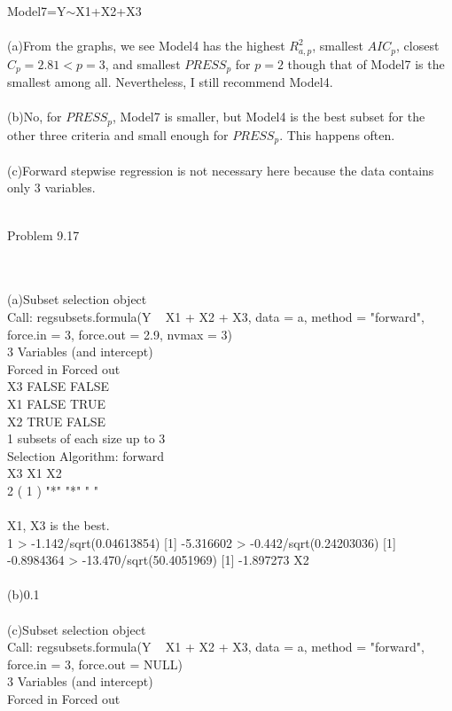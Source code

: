\documentclass{article}
\begin{document}
   Model7=Y$\sim$X1+X2+X3\\\\
   (a)From the graphs, we see Model4 has the highest $R^2_{a,p}$, smallest $AIC_p$, closest $C_p=2.81<p=3$, and smallest $PRESS_p$ for $p=2$ though that of Model7 is the smallest among all. Nevertheless, I still recommend Model4.
   \\\\(b)No, for $PRESS_p$, Model7 is smaller, but Model4 is the best subset for the other three criteria and small enough for $PRESS_p$. This happens often.
   \\\\(c)Forward stepwise regression is not necessary here because the data contains only 3 variables.
    \\\\     \begin{large}Problem 9.17\end{large}
    \\\\(a)Subset selection object\\
Call: regsubsets.formula(Y ~ X1 + X2 + X3, data = a, method = "forward", 
    force.in = 3, force.out = 2.9, nvmax = 3)\\
3 Variables  (and intercept)\\
   Forced in Forced out\\
X3     FALSE      FALSE\\
X1     FALSE       TRUE\\
X2      TRUE      FALSE\\
1 subsets of each size up to 3\\
Selection Algorithm: forward\\
         X3  X1  X2 \\
2  ( 1 ) "*" "*" " "\\\\
X1, X3 is the best.\\
1
> -1.142/sqrt(0.04613854)
[1] -5.316602
> -0.442/sqrt(0.24203036)
[1] -0.8984364
> -13.470/sqrt(50.4051969)
[1] -1.897273
X2
\\\\(b)0.1
\\\\(c)Subset selection object\\
Call: regsubsets.formula(Y ~ X1 + X2 + X3, data = a, method = "forward", 
    force.in = 3, force.out = NULL)\\
3 Variables  (and intercept)\\
   Forced in Forced out\\
\end{document}
